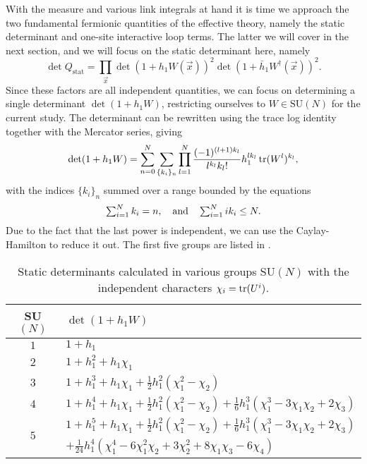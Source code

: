 With the measure and various link integrals at hand it is time we approach the
two fundamental fermionic quantities of the effective theory, namely the static
determinant and one-site interactive loop terms. The latter we will cover in the
next section, and we will focus on the static determinant here, namely
%
\begin{equation}
  \det Q_{\text{stat}} = \prod_{\vec{x}} \det ( 1 + h_1 W(\vec{x}) )^2 
    \det ( 1 + \bar{h}_1 W^{\dagger}(\vec{x}) )^2.
\end{equation}
%
Since these factors are all independent quantities, we can focus on determining
a single determinant $\det(1 + h_1 W)$, restricting ourselves to $W \in
\text{SU}(N)$ for the current study. The determinant can be rewritten using the
trace log identity together with the Mercator series, giving
%
\begin{equation}
  \det ( 1 + h_1 W ) = \sum_{n=0}^N \sum_{\{k_i\}_n} \prod_{l=1}^N
  \frac{(-1)^{(l+1)k_l}}{l^{k_l} k_l!} h_1^{l k_l} \operatorname{tr} (W^l)^{k_l},
\end{equation}
%
with the indices $\{k_i\}_n$ summed over a range bounded by the equations
%
\begin{equation} \textstyle
  \sum_{i=1}^{N} k_i = n, \hskip1em\text{and}\hskip1em
  \sum_{i=1}^N i k_i \leq N .
\end{equation}
%
Due to the fact that the last power is independent, we can use the
Caylay-Hamilton  to reduce it out. The first five
groups are listed in .

\begin{table}
  \begin{center}
    \begin{tabular}{cl} \toprule
      SU$(N)$ & $\det(1 + h_1 W)$ \\ \midrule
      $1$ & $1 + h_1$ \\
      $2$ & $1 + h_1^2 + h_1 \chi_1$ \\
      $3$ & $1 + h_1^3 + h_1\chi_1 + \frac{1}{2} h_1^2 (\chi_1^2 - \chi_2)$ \\
      $4$ & $1 + h_1^4 + h_1 \chi_1 + \frac{1}{2} h_1^2 (\chi_1^2 - \chi_2) +
      \frac{1}{6} h_1^3 (\chi_1^3 - 3 \chi_1 \chi_2 + 2 \chi_3)$ \\
      \multirow{2}{*}{$5$} & $1 + h_1^5 + h_1 \chi_1 + \frac{1}{2} h_1^2 (\chi_1^2 - \chi_2) +
      \frac{1}{6} h_1^3 (\chi_1^3 - 3 \chi_1 \chi_2 + 2 \chi_3) $ \\
      & $ + \frac{1}{24} h_1^4 ( \chi_1^4 - 6 \chi_1^2 \chi_2 + 3 \chi_2^2 +
      8\chi_1 \chi_3 - 6\chi_4 )$ \\ \bottomrule
    \end{tabular}
  \end{center}
  \caption{Static determinants calculated in various groups SU$(N)$ with the
    independent characters $\chi_i = \operatorname{tr}(U^i)$.}
  \label{tab-static-determinant}
\end{table}

